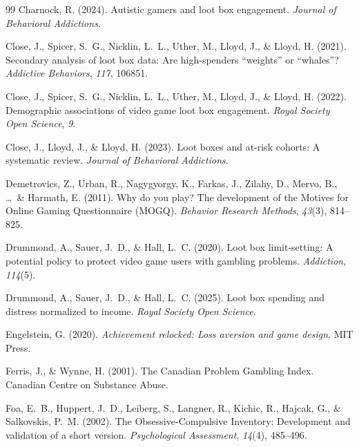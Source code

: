 \documentclass[12pt]{article}
\begin{document}
\begin{thebibliography}{99}
Charnock, R. (2024).
\newblock Autistic gamers and loot box engagement.
\newblock \textit{Journal of Behavioral Addictions}.

Close, J., Spicer, S.~G., Nicklin, L.~L., Uther, M., Lloyd, J., \& Lloyd, H. (2021).
\newblock Secondary analysis of loot box data: Are high-spenders ``weights'' or ``whales''?
\newblock \textit{Addictive Behaviors}, \textit{117}, 106851.

Close, J., Spicer, S.~G., Nicklin, L.~L., Uther, M., Lloyd, J., \& Lloyd, H. (2022).
\newblock Demographic associations of video game loot box engagement.
\newblock \textit{Royal Society Open Science}, \textit{9}.

Close, J., Lloyd, J., \& Lloyd, H. (2023).
\newblock Loot boxes and at-risk cohorts: A systematic review.
\newblock \textit{Journal of Behavioral Addictions}.

Demetrovics, Z., Urban, R., Nagygyorgy, K., Farkas, J., Zilahy, D., Mervo, B., \ldots\ \& Harmath, E. (2011).
\newblock Why do you play? The development of the Motives for Online Gaming Questionnaire (MOGQ).
\newblock \textit{Behavior Research Methods}, \textit{43}(3), 814--825.

Drummond, A., Sauer, J.~D., \& Hall, L.~C. (2020).
\newblock Loot box limit-setting: A potential policy to protect video game users with gambling problems.
\newblock \textit{Addiction}, \textit{114}(5).

Drummond, A., Sauer, J.~D., \& Hall, L.~C. (2025).
\newblock Loot box spending and distress normalized to income.
\newblock \textit{Royal Society Open Science}.

Engelstein, G. (2020).
\newblock \textit{Achievement relocked: Loss aversion and game design}.
\newblock MIT Press.

Ferris, J., \& Wynne, H. (2001).
\newblock The Canadian Problem Gambling Index.
\newblock Canadian Centre on Substance Abuse.

Foa, E.~B., Huppert, J.~D., Leiberg, S., Langner, R., Kichic, R., Hajcak, G., \& Salkovskis, P.~M. (2002).
\newblock The Obsessive-Compulsive Inventory: Development and validation of a short version.
\newblock \textit{Psychological Assessment}, \textit{14}(4), 485--496.


\end{thebibliography}
\end{document}
